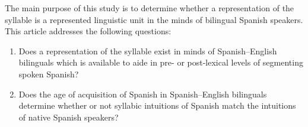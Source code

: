 The main purpose of this study is to determine whether a representation of the syllable is a represented linguistic unit in the minds of bilingual Spanish speakers. This article addresses the following questions:
\begin{enumerate}
\item{Does a representation of the syllable exist in minds of Spanish–English bilinguals which is available to aide in pre- or post-lexical levels of segmenting spoken Spanish?}
\item{Does the age of acquisition of Spanish in Spanish–English bilinguals determine whether or not syllabic intuitions of Spanish match the intuitions of native Spanish speakers?}
\end{enumerate}


